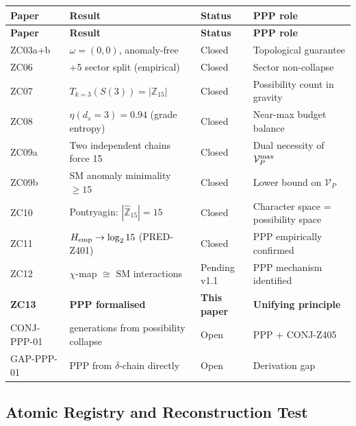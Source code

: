 \documentclass[12pt, a4paper]{article}
\begin{document}
\begin{derivedbox}[title={Z-Programme: Complete status (post ZC13)}]
{\small
\setlength{\LTpre}{4pt}\setlength{\LTpost}{4pt}
\renewcommand{\arraystretch}{1.30}
\begin{longtable}{>{\centering\arraybackslash}p{1.8cm}
                  >{\raggedright\arraybackslash}p{6.0cm}
                  >{\centering\arraybackslash}p{2.0cm}
                  >{\raggedright\arraybackslash}p{2.5cm}}
\toprule
\textbf{Paper} & \textbf{Result} & \textbf{Status} & \textbf{PPP role} \\
\midrule
\endfirsthead
\toprule
\textbf{Paper} & \textbf{Result} & \textbf{Status} & \textbf{PPP role} \\
\midrule
\endhead
\bottomrule
\endlastfoot
ZC03a+b & $\omega = (0,0)$, anomaly-free
  & Closed & Topological guarantee \\
ZC06 & 3+5 sector split (empirical)
  & Closed & Sector non-collapse \\
ZC07 & $T_{k=3}(S(3)) = |\mathbb{Z}_{15}|$
  & Closed & Possibility count in gravity \\
ZC08 & $\eta(d_s=3) = 0.94$ (grade entropy)
  & Closed & Near-max budget balance \\
ZC09a & Two independent chains force 15
  & Closed & Dual necessity of $\mathcal{V}_P^{\rm max}$ \\
ZC09b & SM anomaly minimality $\geq 15$
  & Closed & Lower bound on $\mathcal{V}_P$ \\
ZC10 & Pontryagin: $|\hat{\mathbb{Z}}_{15}| = 15$
  & Closed & Character space = possibility space \\
ZC11 & $H_{\rm emp} \to \log_2 15$ (PRED-Z401)
  & Closed & PPP empirically confirmed \\
ZC12 & $\chi$-map $\cong$ SM interactions
  & Pending v1.1 & PPP mechanism identified \\
\textbf{ZC13} & \textbf{PPP formalised}
  & \textbf{This paper} & \textbf{Unifying principle} \\
\midrule
CONJ-PPP-01 & 3 generations from possibility collapse
  & Open & PPP + CONJ-Z405 \\
GAP-PPP-01 & PPP from $\delta$-chain directly
  & Open & Derivation gap \\
\end{longtable}
}
\end{derivedbox}

\subsection{Atomic Registry and Reconstruction Test}
\label{sec:registry}
\end{document}

